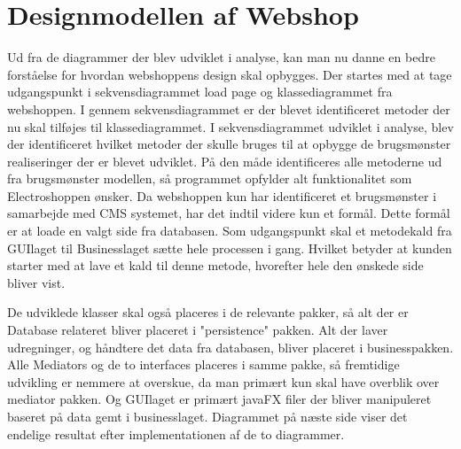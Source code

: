 \section{Designmodellen af Webshop}
Ud fra de diagrammer der blev udviklet i analyse, kan man nu danne en bedre forståelse for hvordan webshoppens design skal opbygges. Der startes med at tage udgangspunkt i sekvensdiagrammet load page og klassediagrammet fra webshoppen. I gennem sekvensdiagrammet er der blevet identificeret metoder der nu skal tilføjes til klassediagrammet. I sekvensdiagrammet udviklet i analyse, blev der identificeret hvilket metoder der skulle bruges til at opbygge de brugsmønster realiseringer der er blevet udviklet. På den måde identificeres alle metoderne ud fra brugsmønster modellen, så programmet opfylder alt funktionalitet som Electroshoppen ønsker. Da webshoppen kun har identificeret et brugsmønster i samarbejde med CMS systemet, har det indtil videre kun et formål. Dette formål er at loade en valgt side fra databasen. 
Som udgangspunkt skal et metodekald fra GUIlaget til Businesslaget sætte hele processen i gang. Hvilket betyder at kunden starter med at lave et kald til denne metode, hvorefter hele den ønskede side bliver vist. 
 
De udviklede klasser skal også placeres i de relevante pakker, så alt der er Database relateret bliver placeret i "persistence" pakken. Alt der laver udregninger, og håndtere det data fra databasen, bliver placeret i businesspakken. Alle Mediators og de to interfaces placeres i samme pakke, så fremtidige udvikling er nemmere at overskue, da man primært kun skal have overblik over mediator pakken. Og GUIlaget er primært javaFX filer der bliver manipuleret baseret på data gemt i businesslaget. 
Diagrammet på næste side viser det endelige resultat efter implementationen af de to diagrammer.



